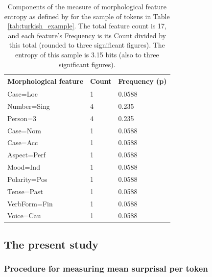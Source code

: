 \documentclass[USenglish]{article}
\begin{document}
\begin{table}[h]
    \centering
    \caption{Components of the measure of morphological feature entropy as defined by \citet{ccoltekin2023complexity} for the sample of tokens in Table \ref{tab:turkish_example}. The total feature count is 17, and each feature's Frequency is its Count divided by this total (rounded to three significant figures). The entropy of this sample is 3.15 bits (also to three significant figures).} %
    \label{tab:mfh}   
    \begin{tabular}{p{5cm}p{3cm}p{3cm}}
\toprule
	\textbf{Morphological feature}	&	\textbf{Count}	&	\textbf{Frequency (p)}	\\
    \midrule
	Case=Loc&1&0.0588       \\    \midrule
	Number=Sing&4&0.235    \\    \midrule
        Person=3&4&0.235		   \\    \midrule
	Case=Nom&1&0.0588	       \\    \midrule
	Case=Acc&1&0.0588		      \\    \midrule
        Aspect=Perf&1&0.0588      \\    \midrule
        Mood=Ind&1&0.0588		   \\    \midrule
        Polarity=Pos&1&0.0588		\\    \midrule
	Tense=Past&1&0.0588	     \\    \midrule
	VerbForm=Fin&1&0.0588	    \\    \midrule
	Voice=Cau&1&0.0588      	\\ \bottomrule

    \end{tabular}
\end{table}

\subsection{The present study}\label{sec:appendix_ours}

\subsubsection{Procedure for measuring mean surprisal per token}
\end{document}
